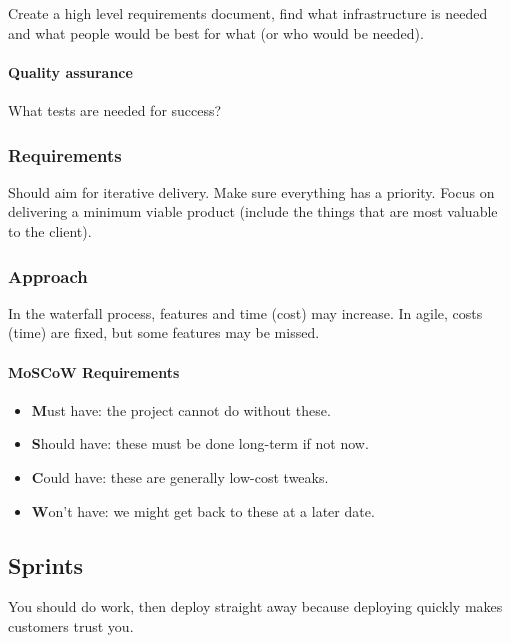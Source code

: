 Create a high level requirements document, find what infrastructure is needed and what people would be best for what (or who would be needed).

\paragraph{Quality assurance}\label{par:quality_assurance}

What tests are needed for success?

\subsubsection{Requirements}\label{sub:requirements}

Should aim for iterative delivery.
Make sure everything has a priority.
Focus on delivering a minimum viable product (include the things that are most valuable to the client).

\subsubsection{Approach}\label{sub:approach}

In the waterfall process, features and time (cost) may increase.
In agile, costs (time) are fixed, but some features may be missed.


\paragraph{MoSCoW Requirements}\label{par:moscow_requirements}

\begin{itemize}
    \item \textbf{M}ust have: the project cannot do without these.
    \item \textbf{S}hould have: these must be done long-term if not now.
    \item \textbf{C}ould have: these are generally low-cost tweaks.
    \item \textbf{W}on't have: we might get back to these at a later date.
\end{itemize}

\subsection{Sprints}\label{sub:sprints}

You should do work, then deploy straight away because deploying quickly makes customers trust you.

